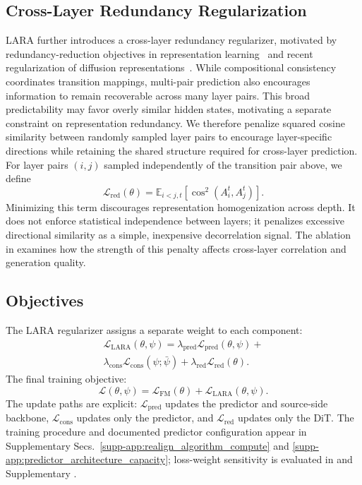 \subsection{Cross-Layer Redundancy Regularization}
LARA further introduces a cross-layer redundancy regularizer, motivated by redundancy-reduction objectives in representation learning~\citep{zbontar2021barlow} and recent regularization of diffusion representations~\citep{wang2025dispersive,li2026diverseditpp}. While compositional consistency coordinates transition mappings, multi-pair prediction also encourages information to remain recoverable across many layer pairs. This broad predictability may favor overly similar hidden states, motivating a separate constraint on representation redundancy. We therefore penalize squared cosine similarity between randomly sampled layer pairs to encourage layer-specific directions while retaining the shared structure required for cross-layer prediction. For layer pairs $(i,j)$ sampled independently of the transition pair above, we define
\begin{equation}
\mathcal{L}_{\mathrm{red}}(\theta)
=
\mathbb{E}_{i<j,t}
\left[
\operatorname{cos}^2(A_i^t,A_j^t)
\right].
\label{eq:redundancy_loss}
\end{equation}
Minimizing this term discourages representation homogenization across depth. It does not enforce statistical independence between layers; it penalizes excessive directional similarity as a simple, inexpensive decorrelation signal. The ablation in  examines how the strength of this penalty affects cross-layer correlation and generation quality.

\subsection{ Objectives}

The LARA regularizer assigns a separate weight to each component:
\begin{equation}
\begin{aligned}
\mathcal{L}_{\mathrm{LARA}}(\theta,\psi)
=
\lambda_{\mathrm{pred}}\mathcal{L}_{\mathrm{pred}}(\theta,\psi)
+
\\
\lambda_{\mathrm{cons}}\mathcal{L}_{\mathrm{cons}}(\psi;\bar\psi)
+
\lambda_{\mathrm{red}}\mathcal{L}_{\mathrm{red}}(\theta).
\end{aligned}
\label{eq:realign_loss}
\end{equation}
The final training objective: 
\begin{equation}
\mathcal{L}(\theta,\psi)
=
\mathcal{L}_{\mathrm{FM}}(\theta)
+
\mathcal{L}_{\mathrm{LARA}}(\theta,\psi).
\label{eq:total_loss}
\end{equation}
The update paths are explicit: $\mathcal{L}_{\mathrm{pred}}$ updates the predictor and source-side backbone, $\mathcal{L}_{\mathrm{cons}}$ updates only the predictor, and $\mathcal{L}_{\mathrm{red}}$ updates only the DiT. The training procedure and documented predictor configuration appear in Supplementary Secs.~\ref{supp-app:realign_algorithm_compute} and \ref{supp-app:predictor_architecture_capacity}; loss-weight sensitivity is evaluated in  and Supplementary .
